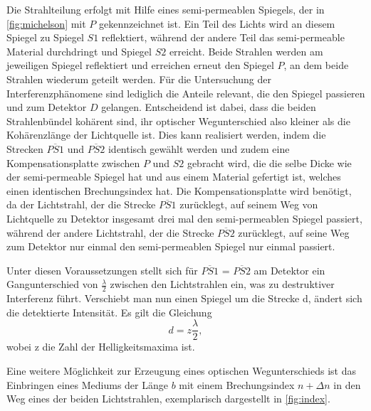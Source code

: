 Die Strahlteilung erfolgt mit Hilfe eines semi-permeablen Spiegels, der in \autoref{fig:michelson} mit $P$ gekennzeichnet
ist. Ein Teil des Lichts wird an diesem Spiegel zu Spiegel $S1$ reflektiert, während der andere Teil das semi-permeable 
Material durchdringt und Spiegel $S2$ erreicht. Beide Strahlen werden am jeweiligen Spiegel reflektiert und erreichen 
erneut den Spiegel $P$, an dem beide Strahlen wiederum geteilt werden. Für die Untersuchung der Interferenzphänomene sind
lediglich die Anteile relevant, die den Spiegel passieren und zum Detektor $D$ gelangen. Entscheidend ist dabei, dass
die beiden Strahlenbündel kohärent sind, ihr optischer Wegunterschied also kleiner als die Kohärenzlänge der Lichtquelle ist.
Dies kann realisiert werden, indem die Strecken $\overline{PS1}$ und $\overline{PS2}$ identisch gewählt werden und zudem eine
Kompensationsplatte zwischen $P$ und $S2$ gebracht wird, die die selbe Dicke wie der semi-permeable Spiegel hat und aus einem
Material gefertigt ist, welches einen identischen Brechungsindex hat. Die Kompensationsplatte wird benötigt, da der Lichtstrahl,
der die Strecke $\overline{PS1}$ zurücklegt, auf seinem Weg von Lichtquelle zu Detektor insgesamt drei mal den semi-permeablen
Spiegel passiert, während der andere Lichtstrahl, der die Strecke $\overline{PS2}$ zurücklegt, auf seine Weg zum Detektor nur einmal
den semi-permeablen Spiegel nur einmal passiert. 

Unter diesen Voraussetzungen stellt sich für $\overline{PS1}$ = $\overline{PS2}$ am Detektor ein Gangunterschied von $\frac{\lambda}{2}$ 
zwischen den Lichtstrahlen ein, was zu destruktiver Interferenz führt. Verschiebt man nun einen Spiegel um die Strecke
d, ändert sich die detektierte Intensität. Es gilt die Gleichung
\begin{equation}
    d = z \frac{\lambda}{2}, 
\end{equation}
wobei z die Zahl der Helligkeitsmaxima ist. 

Eine weitere Möglichkeit zur Erzeugung eines optischen Wegunterschieds ist das Einbringen eines Mediums der Länge $b$ mit einem 
Brechungsindex $n + \Delta n$ in den Weg eines der beiden Lichtstrahlen, exemplarisch dargestellt in \autoref{fig:index}. 

